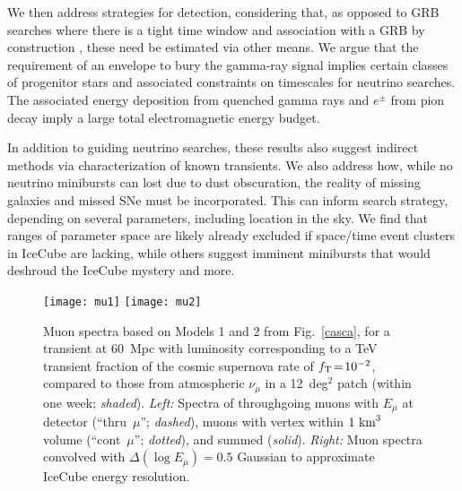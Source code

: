 \documentclass[aps,prd,nofootinbib,twocolumn,floatfix,letterpaper,superscriptaddress,showpacs]{revtex4}
\begin{document}
We then address strategies for detection, considering that, as opposed to GRB searches where there is a tight time window and association with a GRB by construction \cite{Abbasi:2012zw,Aartsen:2014aqy}, these need be estimated via other means.  We argue that the requirement of an envelope to bury the gamma-ray signal implies certain classes of progenitor stars and associated constraints on timescales for neutrino searches.
The associated energy deposition from quenched gamma rays and $e^\pm$ from pion decay imply a large total electromagnetic energy budget.

In addition to guiding neutrino searches, these results also suggest indirect methods via characterization of known transients.
We also address how, while no neutrino minibursts can lost due to dust obscuration, the reality of missing galaxies and missed SNe must be incorporated.  This can inform search strategy, depending on several parameters, including location in the sky.  We find that ranges of parameter space are likely already excluded if space/time event clusters in IceCube are lacking, while others suggest imminent minibursts that would deshroud the IceCube mystery and more.



\begin{figure*}[t!]
\vspace*{-0.5cm}
\texttt{[image: mu1]}
%
\texttt{[image: mu2]}
%
\vspace*{-0.2cm}
\caption{Muon spectra based on Models 1 and 2 from Fig.~\ref{casca}, for a transient at 60~Mpc with luminosity corresponding to a TeV transient fraction of the cosmic supernova rate of $f_{\rm T} \!=\! 10^{-2}$, compared to those from atmospheric $\nu_\mu$ in a 12~deg$^2$ patch (within one week; {\it shaded}).
%
{\it Left:} Spectra of throughgoing muons with $E_\mu$ at detector (``thru~$\mu$''; {\it dashed}), muons with vertex within $1~{\rm km}^3$ volume (``cont~$\mu$''; {\it dotted}), and summed ({\it solid}).
%
{\it Right:} Muon spectra convolved with $\Delta (\log{E_\mu}) \!=\! 0.5$ Gaussian to approximate IceCube energy resolution.
\label{muonspec}}
\end{figure*}

\end{document}
